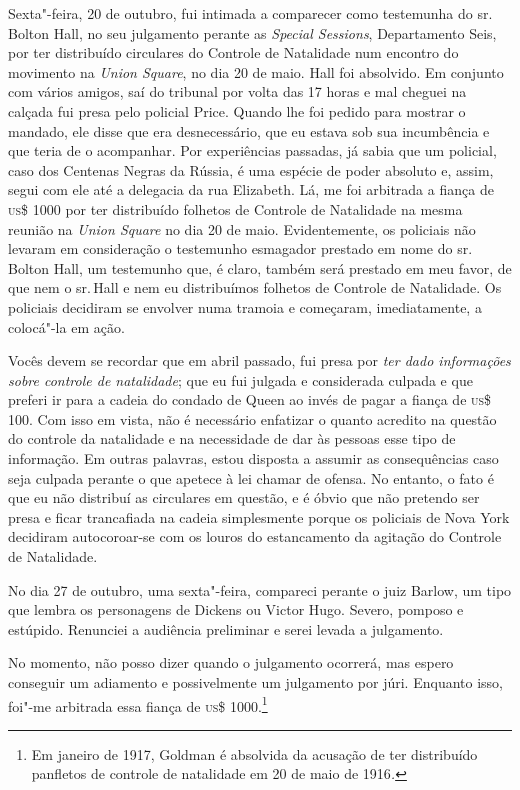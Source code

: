 Sexta"-feira, 20 de outubro, fui intimada a comparecer como testemunha do
sr.\,Bolton Hall, no seu julgamento perante as \emph{Special Sessions},
Departamento Seis, por ter distribuído circulares do Controle de
Natalidade num encontro do movimento na \emph{Union Square}, no dia 20
de maio. Hall foi absolvido. Em conjunto com vários amigos, saí do
tribunal por volta das 17 horas e mal cheguei na calçada fui presa pelo
policial Price. Quando lhe foi pedido para mostrar o mandado, ele disse
que era desnecessário, que eu estava sob sua incumbência e que teria de
o acompanhar. Por experiências passadas, já sabia que um policial, caso
dos Centenas Negras da Rússia, é uma espécie de poder absoluto e, assim,
segui com ele até a delegacia da rua Elizabeth. Lá, me foi arbitrada a
fiança de \textsc{us}\$ 1000 por ter distribuído folhetos de Controle de
Natalidade na mesma reunião na \emph{Union Square} no dia 20 de maio.
Evidentemente, os policiais não levaram em consideração o testemunho
esmagador prestado em nome do sr.\,Bolton Hall, um testemunho que, é
claro, também será prestado em meu favor, de que nem o sr.\,Hall e nem eu
distribuímos folhetos de Controle de Natalidade. Os policiais decidiram
se envolver numa tramoia e começaram, imediatamente, a colocá"-la em
ação.

Vocês devem se recordar que em abril passado, fui presa por \emph{ter
dado informações sobre controle de natalidade}; que eu fui julgada e
considerada culpada e que preferi ir para a cadeia do condado de Queen
ao invés de pagar a fiança de \textsc{us}\$ 100. Com isso em vista, não é
necessário enfatizar o quanto acredito na questão do controle da
natalidade e na necessidade de dar às pessoas esse tipo de informação.
Em outras palavras, estou disposta a assumir as consequências caso seja
culpada perante o que apetece à lei chamar de ofensa. No entanto, o fato
é que eu não distribuí as circulares em questão, e é óbvio que não
pretendo ser presa e ficar trancafiada na cadeia simplesmente porque os
policiais de Nova York decidiram autocoroar-se com os louros do estancamento
da agitação do Controle de Natalidade.

\asterisc

No dia 27 de outubro, uma sexta"-feira, compareci perante o juiz Barlow,
um tipo que lembra os personagens de Dickens ou Victor Hugo. Severo,
pomposo e estúpido. Renunciei a audiência preliminar e serei levada a
julgamento.

No momento, não posso dizer quando o julgamento ocorrerá, mas espero
conseguir um adiamento e possivelmente um julgamento por júri. Enquanto
isso, foi"-me arbitrada essa fiança de \textsc{us}\$ 1000.\footnote{Em janeiro de
  1917, Goldman é absolvida da acusação de ter distribuído panfletos de
  controle de natalidade em 20 de maio de 1916\emph{.}}

